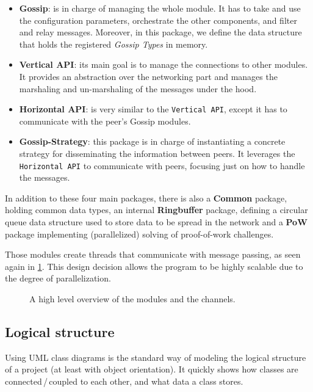 \documentclass[a4paper,english,10pt,NET]{tumarticle}
\begin{document}
\begin{itemize}
	\item \textbf{Gossip}:
		is in charge of managing the whole module.
		It has to take and use the configuration parameters, orchestrate the other components, and filter and relay messages.
		Moreover, in this package, we define the data structure that holds the registered \textit{Gossip Types} in memory.
	\item \textbf{Vertical API}:
		its main goal is to manage the connections to other modules.
		It provides an abstraction over the networking part and manages the marshaling and un-marshaling of the messages under the hood.
	\item \textbf{Horizontal API}:
		is very similar to the \texttt{Vertical API}, except it has to communicate with the peer's Gossip modules.
	\item \textbf{Gossip-Strategy}:
		this package is in charge of instantiating a concrete strategy for disseminating the information between peers.
		It leverages the \texttt{Horizontal API} to communicate with peers, focusing just on how to handle the messages.
\end{itemize}

In addition to these four main packages, there is also a \textbf{Common} package, holding common data types, an internal \textbf{Ringbuffer} package, defining a circular queue data structure used to store data to be spread in the network and a \textbf{PoW} package implementing (parallelized) solving of proof-of-work challenges.

Those modules create threads that communicate with message passing, as seen again in \cref{fig:overview}. This design decision allows the program to be highly scalable due to the degree of parallelization.

\begin{figure}
	\centering
	
	\caption{A high level overview of the modules and the channels.}
	\label{fig:overview}
\end{figure}

\subsection{Logical structure}
Using UML class diagrams is the standard way of modeling the logical structure of a project (at least with object orientation).
It quickly shows how classes are connected\,/\,coupled to each other, and what data a class stores.
\end{document}
